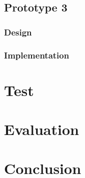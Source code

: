 \documentclass[11pt,oneside]{report}
\begin{document}
	\section{Prototype 3}\label{sec:p3}
		\subsection{Design}
		\subsection{Implementation}
	\chapter{Test}\label{chap:test}
	
	\chapter{Evaluation}\label{chap:eval}
	
	\chapter{Conclusion}\label{chap:concl}

	
	
\end{document}
